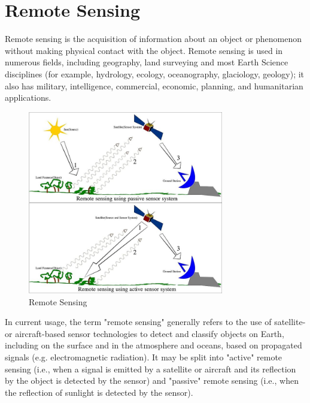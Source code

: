 \documentclass[document.tex]{subfiles}
\begin{document}
\section{Remote Sensing}
\noindent Remote sensing is the acquisition of information about an object or phenomenon without making physical contact with the object. Remote sensing is used in numerous fields, including geography, land surveying and most Earth Science disciplines (for example, hydrology, ecology, oceanography, glaciology, geology); it also has military, intelligence, commercial, economic, planning, and humanitarian applications.
\begin{figure}[H]
	\begin{center}
		\includegraphics[height=8.0cm]{imgs/Remote_Sensing.jpg}
	\end{center}
	\caption{Remote Sensing}
	\label{fig: Remote Sensing}
\end{figure}
\noindent In current usage, the term "remote sensing" generally refers to the use of satellite- or aircraft-based sensor technologies to detect and classify objects on Earth, including on the surface and in the atmosphere and oceans, based on propagated signals (e.g. electromagnetic radiation). It may be split into "active" remote sensing (i.e., when a signal is emitted by a satellite or aircraft and its reflection by the object is detected by the sensor) and "passive" remote sensing (i.e., when the reflection of sunlight is detected by the sensor).
\end{document}
